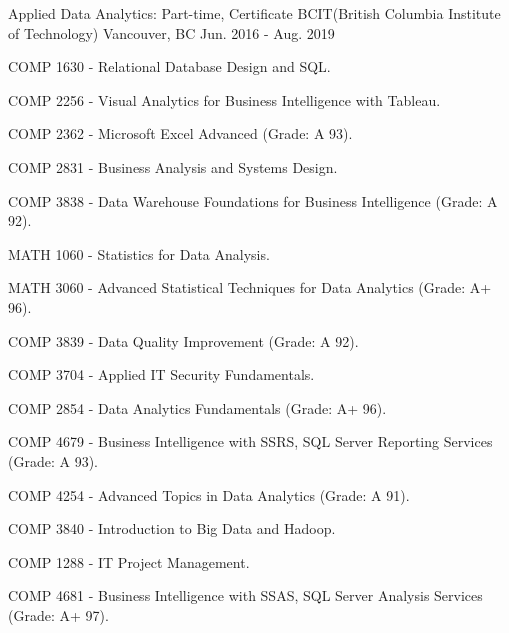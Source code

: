 \documentclass[11pt, a4paper]{awesome-cv}
\begin{document}
\begin{cventries}

  \cventry
    {Applied Data Analytics: Part-time, Certificate} %
    {BCIT(British Columbia Institute of Technology)} %
    {Vancouver, BC} %
    {Jun. 2016 - Aug. 2019} %
    {
      \begin{cvitems} %
        \item {COMP 1630 - Relational Database Design and SQL.}
        \item {COMP 2256 - Visual Analytics for Business Intelligence with Tableau.}
        \item {COMP 2362 - Microsoft Excel Advanced (Grade: A 93).}
        \item {COMP 2831 - Business Analysis and Systems Design.}
        \item {COMP 3838 - Data Warehouse Foundations for Business Intelligence (Grade: A 92).}
        \item {MATH 1060 - Statistics for Data Analysis.}
        \item {MATH 3060 - Advanced Statistical Techniques for Data Analytics (Grade: A+ 96).}
        \item {COMP 3839 - Data Quality Improvement (Grade: A 92).}
        \item {COMP 3704 - Applied IT Security Fundamentals.}
        \item {COMP 2854 - Data Analytics Fundamentals (Grade: A+ 96).}
        \item {COMP 4679 - Business Intelligence with SSRS, SQL Server Reporting Services (Grade: A 93).}
        \item {COMP 4254 - Advanced Topics in Data Analytics (Grade: A 91).}
        \item {COMP 3840 - Introduction to Big Data and Hadoop.}
        \item {COMP 1288 - IT Project Management.}
        \item {COMP 4681 - Business Intelligence with SSAS, SQL Server Analysis Services (Grade: A+ 97).}
      \end{cvitems}
    }

\end{cventries}
\end{document}
